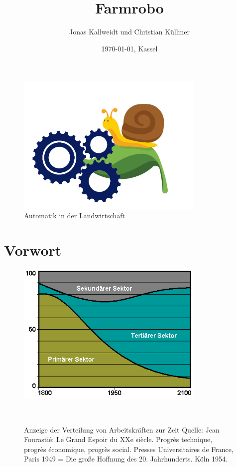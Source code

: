 \documentclass[]{article}
\title{Farmrobo}
\author{Jonas Kallweidt und Christian Küllmer}
\date{\today{}, Kassel}
\begin{document}
\maketitle
\begin{figure}[H]
	\centering
	\includegraphics[width=0.8\textwidth]{DeckblattFarmrobo.jpg}
	\caption{Automatik in der Landwirtschaft}
	\label{img:grafik-dummy}
\end{figure}
\newpage
\tableofcontents


\begin{abstract}
	

\end{abstract}

\section{Vorwort}

	\begin{figure}[H]
	\centering
	\includegraphics[width=0.8\textwidth]{Fourastie.png}
	\caption{Anzeige der Verteilung von Arbeitskräften zur Zeit \newline
		Quelle: Jean Fourastié: Le Grand Espoir du XXe siècle. Progrès technique, progrès économique, progrès social. Presses Universitaires de France, Paris 1949 = Die große Hoffnung des 20. Jahrhunderts. Köln 1954.}
	\
	\label{img:grafik-dummy}
	
\end{figure} 
\end{document}
